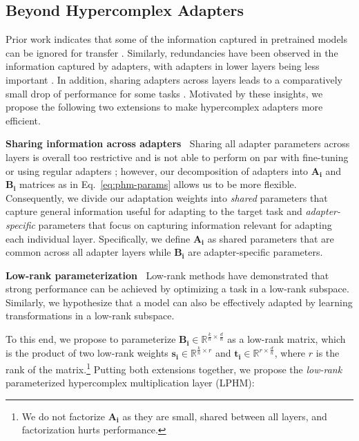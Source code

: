 \subsection{Beyond Hypercomplex Adapters}

Prior work indicates that some of the information captured in pretrained models can be ignored for transfer \citep{Zhang2021revisiting,Chung2021rembert}. Similarly, redundancies have been observed in the information captured by adapters, with adapters in lower layers being less important \citep{houlsby2019parameter}. In addition, sharing adapters across layers leads to a comparatively small drop of performance for some tasks \citep{Ruckle2020adapterdrop}. Motivated by these insights, we propose the following two extensions to make hypercomplex adapters more efficient. 

 \textbf{Sharing information across adapters} $\:$ Sharing all adapter parameters across layers is overall too restrictive and is not able to perform on par with fine-tuning or using regular adapters \citep{Ruckle2020adapterdrop}; however, our decomposition of adapters into $\bm{A_i}$ and $\bm{B_i}$ matrices as in Eq.~\eqref{eq:phm-params} allows us to be more flexible. Consequently, we divide our adaptation weights into \emph{shared} parameters that capture general information useful for adapting to the target task and \emph{adapter-specific} parameters that focus on capturing information relevant for adapting each individual layer. Specifically, we define $\bm{A_i}$ as shared parameters that are common across all adapter layers while $\bm{B_i}$ are adapter-specific parameters.

 \textbf{Low-rank parameterization} $\:$ Low-rank methods \citep{li2018measuring,aghajanyan2020intrinsic} have demonstrated that strong performance can be achieved by optimizing a task in a low-rank subspace. Similarly, we hypothesize that a model can also be effectively adapted by learning transformations in a low-rank subspace.

To this end, we propose to parameterize $\bm{B_i}\in\mathbb{R}^{\frac{k}{n}\times \frac{d}{n}}$ as a low-rank matrix, which is the product of two low-rank weights $\bm{s_i} \in \mathbb{R}^{\frac{k}{n}\times r}$ and $\bm{t_i}\in \mathbb{R}^{r \times {\frac{d}{n}}}$, where $r$ is the rank of the matrix.\footnote{We do not factorize $\bm{A_i}$ as they are small, shared between all layers, and factorization hurts performance.} Putting both extensions together, we propose the \emph{low-rank} parameterized hypercomplex multiplication layer (LPHM):


